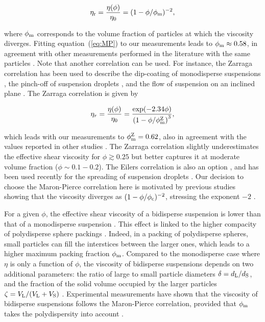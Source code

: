 \documentclass{jfm}
\begin{document}
\begin{equation}\label{eq:MP}
    \eta_{\rm r}=\frac{\eta(\phi)}{\eta_0}=(1-\phi/\phi_{\rm m})^{-2},
\end{equation}

\noindent where $\phi_{\rm m}$ corresponds to the volume fraction of particles at which the viscosity diverges. Fitting equation~(\ref{eq:MP}) to our measurements leads to $\phi_{\rm m} \approx 0.58$, in agreement with other measurements performed in the literature with the same particles \cite[][]{guazzelli2018rheology,chateau2018pinch}. Note that another correlation can be used. For instance, the Zarraga correlation \cite[][]{zarraga2000characterization} has been used to describe the dip-coating of monodisperse suspensions \cite[][]{gans2019dip}, the pinch-off of suspension droplets \cite[][]{bonnoit2012accelerated}, and the flow of suspension on an inclined plane \cite[][]{bonnoit2010inclined}. The Zarraga correlation is given by

\begin{equation}\label{eq:Z}
\eta_r=\frac{\eta(\phi)}{\eta_0}=\frac{\exp (-2.34 \phi)}{\left(1-\phi / \phi_{\rm m}^{\rm Z}\right)^{3}},
\end{equation}

\noindent which leads with our measurements to $\phi_{\rm m}^{\rm Z}=0.62$, also in agreement with the values reported in other studies \cite[][]{bonnoit2012accelerated}. The Zarraga correlation slightly underestimates the effective shear viscosity for 
$\phi \gtrsim 0.25$ but better captures it at moderate volume fraction ($\phi \sim 0.1-0.2$). The Eilers correlation is also an option \cite[][]{stickel2005fluid}, and has been used recently for the spreading of suspension droplets \cite[][]{zhao2020spreading}. Our decision to choose the Maron-Pierce correlation here is motivated by previous studies showing that the viscosity diverges as $(1-\phi/\phi_{\rm c})^{-2}$, stressing the exponent $-2$ \cite[][]{guazzelli2018rheology}.

For a given $\phi$, the effective shear viscosity of a bidisperse suspension is lower than that of a monodisperse suspension \cite[][]{shapiro1992random,probstein1994bimodal,gamonpilas2016shear,guy2020testing}. This effect is linked to the higher compacity of polydisperse sphere packings \cite[][]{ouchiyama1984porosity}. Indeed, in a packing of polydisperse spheres, small particles can fill the interstices between the larger ones, which leads to a higher maximum packing fraction $\phi_{\rm m}$. Compared to the monodisperse case where $\eta$ is only a function of $\phi$,
the viscosity of bidisperse suspensions depends on two additional parameters:
the ratio of large to small particle diameters $\delta = d_{\rm L}/d_{\rm S}$, and the fraction of the solid volume occupied by the larger particles $\zeta = V_{\rm L}/(V_{\rm L} + V_{\rm S})$ \cite[][]{shapiro1992random}. Experimental measurements have shown that the viscosity of bidisperse suspensions follows the Maron-Pierce correlation, provided that $\phi_{\rm m}$ takes the polydispersity into account \cite[][]{thievenaz2021droplet}.
\end{document}
